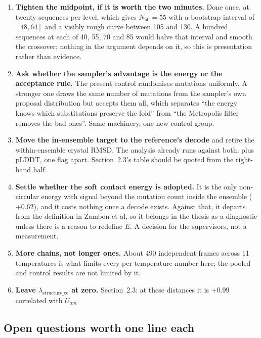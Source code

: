\documentclass[11pt,a4paper]{article}
\begin{document}
\begin{enumerate}
\item \textbf{Tighten the midpoint, if it is worth the two minutes.} Done once, at twenty
sequences per level, which gives $N_{50} = 55$ with a bootstrap interval of $[48,64]$ and a
visibly rough curve between 105 and 130. A hundred sequences at each of 40, 55, 70 and 85
would halve that interval and smooth the crossover; nothing in the argument depends on it,
so this is presentation rather than evidence.

\item \textbf{Ask whether the sampler's advantage is the energy or the acceptance rule.} The
present control randomises mutations uniformly. A stronger one draws the same number of
mutations from the sampler's own proposal distribution but accepts them all, which separates
``the energy knows which substitutions preserve the fold'' from ``the Metropolis filter
removes the bad ones''. Same machinery, one new control group.

\item \textbf{Move the in-ensemble target to the reference's decode} and retire the
within-ensemble crystal RMSD. The analysis already runs against both, plus pLDDT, one flag
apart. Section~2.3's table should be quoted from the right-hand half.

\item \textbf{Settle whether the soft contact energy is adopted.} It is the only
non-circular energy with signal beyond the mutation count inside the ensemble ($+0.62$), and
it costs nothing once a decode exists. Against that, it departs from the definition in
Zambon et al, so it belongs in the thesis as a diagnostic unless there is a reason to
redefine $E$. A decision for the supervisors, not a measurement.

\item \textbf{More chains, not longer ones.} About 490 independent frames across 11
temperatures is what limits every per-temperature number here; the pooled and control
results are not limited by it.

\item \textbf{Leave $\lambda_{\mathrm{structure\_ce}}$ at zero.} Section~2.3: at these
distances it is $+0.99$ correlated with $U_{am}$.
\end{enumerate}

\subsection*{Open questions worth one line each}
\end{document}
